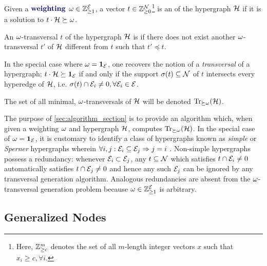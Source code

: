 \documentclass[aps, 10pt, english, twoside, twocolumn, pra, nofootinbib, tightenlines, longbibliography, superscriptaddress]{revtex4-1}
\begin{document}
    \begin{definition}
        Given a $\term{weighting}$ $\omega \in {\mathbb{Z}}_{\geq 1}^{\mathcal{E}}$, a vector $t \in {\mathbb{Z}}_{\geq 0}^{\mathcal{N}}$\footnote{Here, ${\mathbb{Z}}_{\geq c}^{m}$ denotes the set of all $m$-length integer vectors $x$ such that $x_{i} \geq c, \forall i$.} is an  of the hypergraph $\mathcal{H}$ if it is a solution to $t \cdot \mathcal{H} \succeq \omega$.
    \end{definition}

    \begin{definition}
        An $\omega$-transversal $t$ of the hypergraph $\mathcal{H}$ is  if there does not exist another $\omega$-transversal $t'$ of $\mathcal{H}$ different from $t$ such that $t' \preceq t$.
    \end{definition}

    In the special case where $\omega = \mathbf{1}_{\mathcal{E}}$, one recovers the notion of a \textit{transversal} of a hypergraph; $t \cdot \mathcal{H} \succeq \mathbf{1}_{\mathcal{E}}$ if and only if the support $\si\br{t} \subseteq \nodes$ of $t$ intersects every hyperedge of $\mathcal{H}$, i.e. $\si\br{t} \cap \edges_{i} \neq 0, \forall \edges_i \in \edges$.

    \begin{definition}
        The set of all minimal, $\omega$-transversals of $\mathcal{H}$ will be denoted $\transversals{\succeq\w}{\hypergraph}$.
    \end{definition}

    The purpose of \cref{sec:algorithm_section} is to provide an algorithm which, when given a weighting $\omega$ and hypergraph $\mathcal{H}$, computes $\transversals{\succeq\w}{\hypergraph}$. In the special case of $\omega = \mathbf{1}_{\mathcal{E}}$, it is customary to identify a class of hypergraphs known as \textit{simple} or \textit{Sperner} hypergraphs wherein $\forall i, j : \mathcal{E}_i \subseteq \mathcal{E}_j \Rightarrow j = i$ \cite{Berge_1984}. Non-simple hypergraphs possess a redundancy: whenever $\mathcal{E}_i \subset \mathcal{E}_j$, any $t \subseteq \mathcal{N}$ which satisfies $t \cap \mathcal{E}_i \neq 0$ automatically satisfies $t \cap \mathcal{E}_j \neq 0$ and hence any such $\mathcal{E}_j$ can be ignored by any transversal generation algorithm. Analogous redundancies are absent from the $\omega$-transversal generation problem because $\omega \in {\mathbb{Z}}_{\geq 1}^{\mathcal{E}}$ is arbitrary.

    \subsection{Generalized Nodes}
\end{document}
